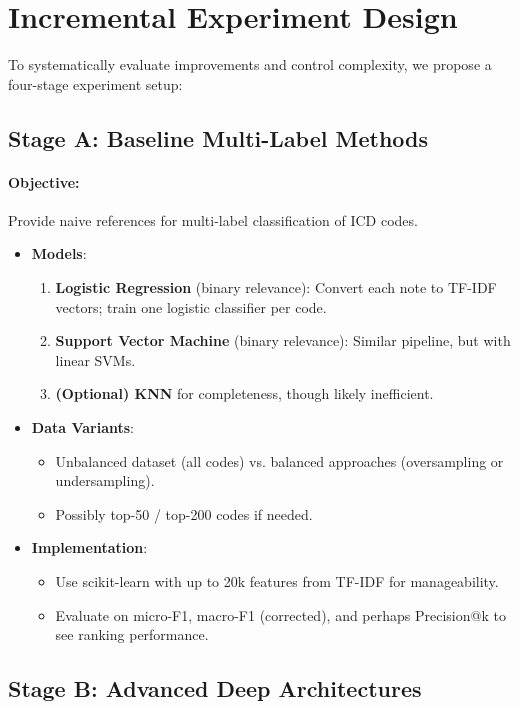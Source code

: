 \section{Incremental Experiment Design}

To systematically evaluate improvements and control complexity, we propose a four-stage experiment setup:

\subsection{Stage A: Baseline Multi-Label Methods}
\paragraph{Objective:} Provide naive references for multi-label classification of ICD codes.

\begin{itemize}
    \item \textbf{Models}:
    \begin{enumerate}
        \item \textbf{Logistic Regression} (binary relevance): Convert each note to TF-IDF vectors; train one logistic classifier per code.
        \item \textbf{Support Vector Machine} (binary relevance): Similar pipeline, but with linear SVMs.
        \item \textbf{(Optional) KNN} for completeness, though likely inefficient.
    \end{enumerate}
    \item \textbf{Data Variants}:
    \begin{itemize}
        \item Unbalanced dataset (all codes) vs. balanced approaches (oversampling or undersampling).
        \item Possibly top-50 / top-200 codes if needed.
    \end{itemize}
    \item \textbf{Implementation}:
    \begin{itemize}
        \item Use scikit-learn with up to 20k features from TF-IDF for manageability.
        \item Evaluate on micro-F1, macro-F1 (corrected), and perhaps Precision@k to see ranking performance.
    \end{itemize}
\end{itemize}


\subsection{Stage B: Advanced Deep Architectures}
